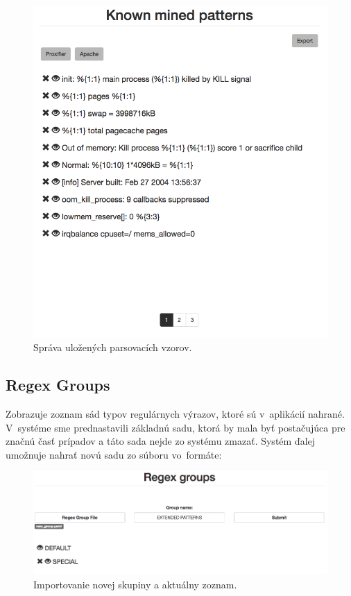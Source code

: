 \begin{figure}[htbp]
 \centering 
 \begin{minipage}{0.95\linewidth}
 	\centering
 	\includegraphics[width=\textwidth]{Images/thesis-pattern.png}
 \end{minipage}
  \caption{Správa uložených parsovacích vzorov.}
  \label{fig:pattern}
\end{figure}

\subsection{Regex Groups}
Zobrazuje zoznam sád typov regulárnych výrazov, ktoré sú v~aplikácií nahrané. V~systéme sme prednastavili základnú sadu, ktorá by mala byť postačujúca pre značnú časť prípadov a táto sada nejde zo systému zmazať. Systém ďalej umožnuje nahrať novú sadu zo súboru vo~formáte:

 \begin{figure}[htbp]
 \centering 
 \begin{minipage}{0.95\linewidth}
 	\centering
 	\includegraphics[width=\textwidth]{Images/thesis-groups.png}
 \end{minipage}
  \caption{Importovanie novej skupiny a aktuálny zoznam.}
  \label{fig:groups}
\end{figure}
